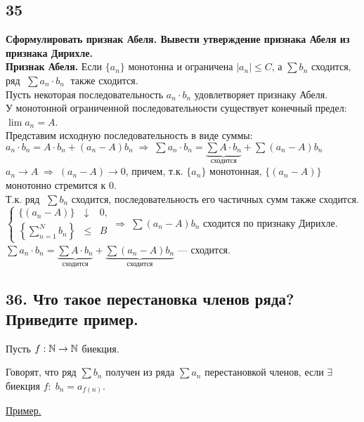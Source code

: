 \documentclass[a4paper, fleqn]{article}
\begin{document}
    \subsection*{35}
        \textbf{Сформулировать признак Абеля. Вывести утверждение признака Абеля из признака Дирихле.} \\[5 pt]
    \textbf{Признак Абеля. } Если $\{ a_n \}$ монотонна и ограничена $|a_n| \le C$, а $\sum b_n$ сходится,
    ряд $\; \sum a_n \cdot b_n \;$ также сходится.\\[5 pt]
    Пусть некоторая последовательность $a_n \cdot b_n$ удовлетворяет признаку Абеля. \\[3 pt]
    У монотонной ограниченной последовательности существует конечный предел: $\lim a_n = A$. \\[3 pt]
    Представим исходную последовательность в виде суммы: \\[3 pt]
    $a_n \cdot b_n = A \cdot b_n + (a_n - A) b_n \; \Rightarrow \; 
    \sum a_n \cdot b_n = \underbrace{\sum A \cdot b_n}_{\text{сходится}} + \sum (a_n - A) b_n$ \\[3 pt]
    $a_n \to A \; \Rightarrow \; (a_n - A) \to 0$, причем, т.к. $\{ a_n \}$ монотонная, $\{ (a_n - A) \}$ монотонно стремится к 0. \\[3 pt]
    Т.к. ряд $\;\sum b_n$ сходится, последовательность его частичных сумм также сходится. \\[3 pt]
    $\left\{\begin{array}{lll} 
    \{ (a_n - A) \} &\downarrow& 0,\\[10 pt]
    \left\{ \sum\limits_{n=1}^N b_n \right\} &\le& B
    \end{array}\right. \Rightarrow \; \sum (a_n - A) b_n$ сходится по признаку Дирихле.\\[3 pt]
    $\sum a_n \cdot b_n = \underbrace{\sum A \cdot b_n}_{\text{сходится}} +\underbrace{\sum (a_n - A) b_n}_{\text{сходится}}$ --- сходится.    
    
    \subsection*{36. Что такое перестановка членов ряда? Приведите пример.}
    
    Пусть $f: \mathbb{N} \to \mathbb{N}$ биекция.
    
    Говорят, что ряд $\sum b_n$ получен из ряда $\sum a_n$ перестановкой членов, если $\exists$ биекция $f: \; b_n = a_{f(n)}.$ 
    
    \underline{Пример.}
    
\end{document}
